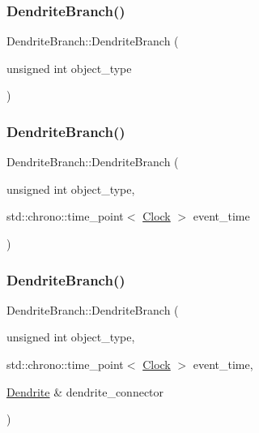 \subsubsection{\texorpdfstring{Dendrite\+Branch()}{DendriteBranch()}\hspace{0.1cm}{\footnotesize\ttfamily [2/4]}}
{\footnotesize\ttfamily Dendrite\+Branch\+::\+Dendrite\+Branch (\begin{DoxyParamCaption}\item[{unsigned int}]{object\+\_\+type }\end{DoxyParamCaption})\hspace{0.3cm}{\ttfamily [inline]}}

\mbox{\label{classDendriteBranch_a390bfee680074f5f3ddcd9aee54db679}} 
\subsubsection{\texorpdfstring{Dendrite\+Branch()}{DendriteBranch()}\hspace{0.1cm}{\footnotesize\ttfamily [3/4]}}
{\footnotesize\ttfamily Dendrite\+Branch\+::\+Dendrite\+Branch (\begin{DoxyParamCaption}\item[{unsigned int}]{object\+\_\+type,  }\item[{std\+::chrono\+::time\+\_\+point$<$ \mbox{\hyperlink{universe_8h_a0ef8d951d1ca5ab3cfaf7ab4c7a6fd80}{Clock}} $>$}]{event\+\_\+time }\end{DoxyParamCaption})\hspace{0.3cm}{\ttfamily [inline]}}

\mbox{\label{classDendriteBranch_a9b7e932b0614dad370edd76f31900c40}} 
\subsubsection{\texorpdfstring{Dendrite\+Branch()}{DendriteBranch()}\hspace{0.1cm}{\footnotesize\ttfamily [4/4]}}
{\footnotesize\ttfamily Dendrite\+Branch\+::\+Dendrite\+Branch (\begin{DoxyParamCaption}\item[{unsigned int}]{object\+\_\+type,  }\item[{std\+::chrono\+::time\+\_\+point$<$ \mbox{\hyperlink{universe_8h_a0ef8d951d1ca5ab3cfaf7ab4c7a6fd80}{Clock}} $>$}]{event\+\_\+time,  }\item[{\mbox{\hyperlink{classDendrite}{Dendrite}} \&}]{dendrite\+\_\+connector }\end{DoxyParamCaption})\hspace{0.3cm}{\ttfamily [inline]}}

